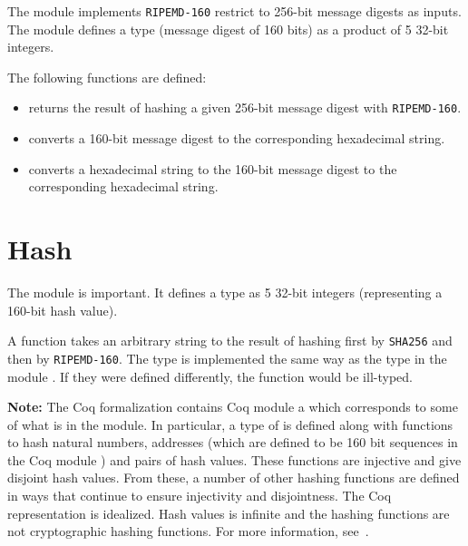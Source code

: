 The module {} implements {\tt{RIPEMD-160}} restrict to 256-bit message digests as inputs.
The module defines a type {} (message digest of 160 bits)
as a product of 5 32-bit integers.

The following functions are defined:

\begin{itemize}
\item {} returns the result of hashing a given 256-bit message digest with {\tt{RIPEMD-160}}.
\item {} converts a 160-bit message digest to the corresponding hexadecimal string.
\item {} converts a hexadecimal string to the 160-bit message digest to the corresponding hexadecimal string.
\end{itemize}

\section{Hash}

The module {} is important. It defines a type {} as 5 32-bit integers (representing a 160-bit hash value).

A function {} takes an arbitrary string to the result of hashing first by {\tt{SHA256}} and then by {\tt{RIPEMD-160}}.
The type {} is implemented the same way as the type {} in the module {}. If they were defined differently, the function {} would be ill-typed.

{\bf{Note:}} The Coq formalization contains Coq module a {} which corresponds
to some of what is in the {} module.
In particular, a type of {} is defined along with functions to hash natural numbers,
addresses (which are defined to be 160 bit sequences in the Coq module {})
and pairs of hash values. These functions are injective and give disjoint hash values.
From these, a number of other hashing functions are defined in ways that continue
to ensure injectivity and disjointness. The Coq representation is idealized.
Hash values is infinite and the hashing functions are not cryptographic hashing functions.
For more information, see~\cite{White2015a}.


